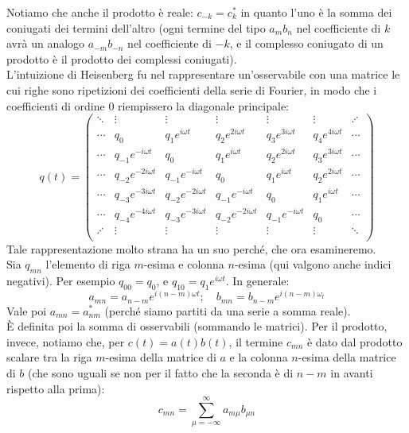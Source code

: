 \documentclass[FisicaTeorica.tex]{subfiles}
\begin{document}
Notiamo che anche il prodotto è reale: $c_{-k} = c_k^*$ in quanto l'uno è la somma dei coniugati dei termini dell'altro (ogni termine del tipo $a_m b_n$ nel coefficiente di $k$ avrà un analogo $a_{-m}b_{-n}$ nel coefficiente di $-k$, e il complesso coniugato di un prodotto è il prodotto dei complessi coniugati).\\
L'intuizione di Heisenberg fu nel rappresentare un'osservabile con una matrice le cui righe sono ripetizioni  dei coefficienti della serie di Fourier, in modo che i coefficienti di ordine $0$ riempissero la diagonale principale:
\[
q(t) = \begin{pmatrix}
\ddots & \vdots & \vdots & \vdots & \vdots & \vdots & \iddots\\
\cdots & q_0 & q_1 e^{i\omega t} & q_2 e^{2i\omega t} & q_3 e^{3i\omega t} & q_4 e^{4i\omega t}  & \cdots\\
\cdots & q_{-1}e^{-i\omega t} &  q_0 & q_1 e^{i\omega t} & q_2 e^{2i\omega t} & q_3 e^{3i\omega t}  & \cdots\\
\cdots & q_{-2}e^{-2i\omega t} & q_{-1}e^{-i\omega t} &  q_0 & q_1 e^{i\omega t} & q_2 e^{2i\omega t} & \cdots\\
\cdots & q_{-3}e^{-3i\omega t} & q_{-2}e^{-2i\omega t} & q_{-1}e^{-i\omega t} &  q_0 & q_1 e^{i\omega t}  & \cdots\\
\cdots & q_{-4}e^{-4i\omega t} & q_{-3}e^{-3i\omega t} & q_{-2}e^{-2i\omega t} & q_{-1}e^{-i\omega t} &  q_0 & \cdots\\
\iddots & \vdots & \vdots & \vdots & \vdots & \vdots & \ddots\\
\end{pmatrix}
\]
Tale rappresentazione molto strana ha un suo perché, che ora esamineremo.\\
Sia $q_{mn}$ l'elemento di riga $m$-esima e colonna $n$-esima (qui valgono anche indici negativi). Per esempio $q_{00} = q_0$, e $q_{10} = q_1 e^{i\omega t}$. In generale:
\[
a_{mn} = a_{n-m}e^{i(n-m)\omega t}; \quad b_{mn} = b_{n-m}e^{i(n-m)\omega_t}
\]
Vale poi $a_{mn} = a^*_{nm}$ (perché siamo partiti da una serie a somma reale).\\
È definita poi la somma di osservabili (sommando le matrici). Per il prodotto, invece, notiamo che, per $c(t) = a(t) b(t)$, il termine $c_{mn}$ è dato dal prodotto scalare tra la riga $m$-esima della matrice di $a$ e la colonna $n$-esima della matrice di $b$ (che sono uguali se non per il fatto che la seconda è  di $n-m$ in avanti rispetto alla prima):
\[
c_{mn} = \sum_{\mu=-\infty}^\infty a_{m\mu} b_{\mu n}
\]
\end{document}
